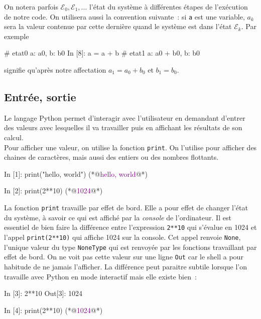 \documentclass{magnoliaold}
\begin{document}
On notera parfois $\mathcal{E}_0, \mathcal{E}_1, \dots$ l'état du système à
différentes étapes de l'exécution de notre code. On utilisera aussi la convention
suivante~: si \verb_a_ est une variable, $a_k$ sera la valeur contenue par cette dernière
quand le système est dans l'état $\mathcal{E}_k$. Par exemple

\begin{pythoncode}
# etat0 {a: a0, b: b0}
In [8]: a = a + b
# etat1 {a: a0 + b0, b: b0} 
\end{pythoncode}

\noindent signifie qu'après notre affectation $a_1=a_0+b_0$ et $b_1=b_0$.


\subsection{Entrée, sortie}

Le langage Python permet d'interagir avec l'utilisateur en demandant d'entrer des valeurs avec lesquelles il va travailler puis en affichant les résultats de son calcul.\\

Pour afficher une valeur, on utilise la fonction \verb_print_. On l'utilise pour afficher des chaines de caractères, mais aussi des entiers ou des nombres flottants.


\begin{pythoncode}
In [1]: print("hello, world")
(*@\textcolor{purple}{hello, world}@*)

In [2]: print(2**10)
(*@\textcolor{purple}{1024}@*)
\end{pythoncode}


\noindent La fonction \verb_print_ travaille par effet de bord. Elle a pour effet de
changer l'état du système, à savoir ce qui est affiché par la \emph{console} de l'ordinateur.
Il est essentiel de bien faire la différence entre l'expression \verb_2**10_ qui s'évalue en
1024 et l'appel \verb_print(2**10)_ qui affiche 1024 sur la console. Cet appel 
renvoie \verb_None_, l'unique valeur du type \verb_NoneType_ qui est renvoyée par les 
fonctions travaillant par effet de bord. On ne voit pas cette valeur sur une ligne \verb!Out! car le shell a pour habitude de ne jamais l'afficher. La différence peut paraitre subtile lorsque l'on 
travaille avec Python en mode interactif mais elle existe bien~:
\begin{pythoncode}
In [3]: 2**10
Out[3]: 1024

In [4]: print(2**10)
(*@\textcolor{purple}{1024}@*)
\end{pythoncode}
\end{document}
